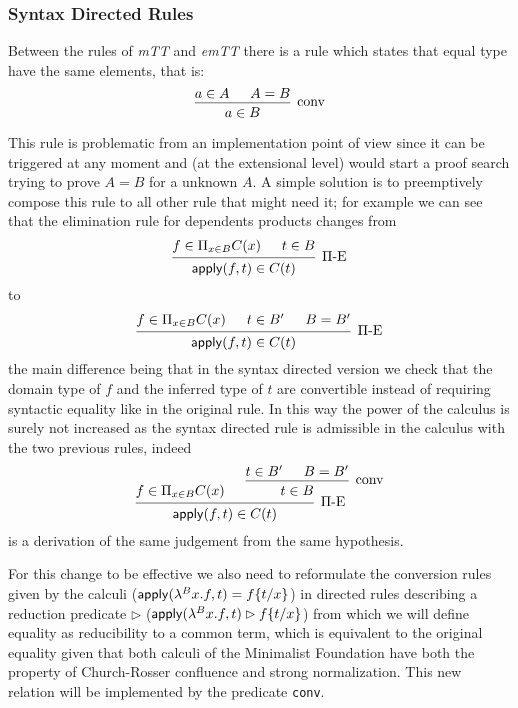 	\subsubsection{Syntax Directed Rules}
	Between the rules of \emph{mTT} and \emph{emTT} there is a rule which states that equal type have the same elements, that is:
	\[
	\begin{prooftree}
	\hypo{a \in A}
	\hypo{A = B}
	\infer2[conv]{a\in B}
	\end{prooftree}
	\]
 	
 	This rule is problematic from an implementation point of view since it can be triggered at any moment and (at the extensional level) would start a proof search trying to prove $A=B$ for a unknown $A$. A simple solution is to preemptively compose this rule to all other rule that might need it; for example we can see that the elimination rule for dependents products changes from 
 	\[
 	\begin{prooftree}
	\hypo{f\in \Pi_{x\in B}{C(x)}}
	\hypo{t \in B}
	\infer2[\ensuremath{\Pi}-E]{\s{apply}(f,t)\in C(t)}
 	\end{prooftree}
 	\]
 	to 
 	\[
 	\begin{prooftree}
 	\hypo{f\in \Pi_{x\in B}{C(x)}}
 	\hypo{t \in B'}
 	\hypo{B=B'}
 	\infer3[\ensuremath{\Pi}-E]{\s{apply}(f,t)\in C(t)}
 	\end{prooftree}
 	\]
 	 the main difference being that in the syntax directed version we check that the domain type of $f$ and the inferred type of $t$ are convertible instead of requiring syntactic equality like in the original rule. In this way the power of the calculus is surely not increased as the syntax directed rule is admissible in the calculus with the two previous rules, indeed
 	\[\begin{prooftree}
 	\hypo{f\in \Pi_{x\in B}{C(x)}}
 	\hypo{t \in B'}
 	\hypo{B=B'}
 	\infer2[conv]{t \in B}
 	\infer2[\ensuremath{\Pi}-E]{\s{apply}(f,t)\in C(t)}
 	\end{prooftree}\]
 	is a derivation of the same judgement from the same hypothesis.
 	
 	For this change to be effective we also need to reformulate the conversion rules given by the calculi (\eg ${\text{\ensuremath{\mathsf{apply}}}}(\lambda^B x. f,t) = f\{t/x\} $) in directed rules describing a reduction predicate $\rhd$ (\eg  ${\text{\ensuremath{\mathsf{apply}}}}(\lambda^B x. f,t) \rhd f\{t/x\} $) from which we will define equality as reducibility to a common term, which is equivalent to the original equality given that both calculi of the Minimalist Foundation have both the property of Church-Rosser confluence and strong normalization. This new relation will be implemented by the predicate \verb|conv|.
 	
